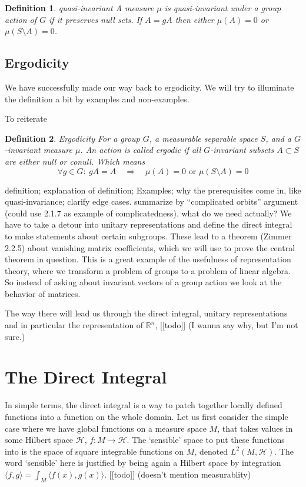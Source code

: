 \documentclass[
]{article}
\newtheorem{defn}{Definition}
\begin{document}
\begin{defn}{quasi-invariant}
A measure $\mu$ is quasi-invariant under a group action of $G$ if it preserves null sets.
If $A = gA$ then either $\mu(A)=0$ or $\mu(S\setminus A)=0$.
\end{defn}

\hypertarget{ergodicity}{%
\subsection{Ergodicity}\label{ergodicity}}

We have successfully made our way back to ergodicity. We will try to
illuminate the definition a bit by examples and non-examples.

To reiterate

\begin{defn}{Ergodicity}
For a group $G$, a measurable separable space $S$, and a $G$-invariant measure $\mu$. An action is called ergodic if all $G$-invariant subsets $A\subset S$ are either null or conull. Which means 
$$
\forall g\in G:\ gA = A \quad \Rightarrow \quad \mu(A)=0 \text{ or } \mu(S\setminus A)=0
$$
\end{defn}

definition; explanation of definition; Examples; why the prerequisites
come in, like quasi-invariance; clarify edge cases. summarize by
``complicated orbits'' argument (could use 2.1.7 as example of
complicatedness).
what do we need actually? We have to take a detour into unitary
representations and define the direct integral to make statements about
certain subgroups. These lead to a theorem (Zimmer 2.2.5) about
vanishing matrix coefficients, which we will use to prove the central
theorem in question. This is a great example of the usefulness of
representation theory, where we transform a problem of groups to a
problem of linear algebra. So instead of asking about invariant vectors
of a group action we look at the behavior of matrices.

The way there will lead us through the direct integral, unitary
representations and in particular the representation of
\(\mathbb{R}^n\), {[}{[}todo{]}{]} (I wanna say why, but I'm not sure.)

\hypertarget{the-direct-integral}{%
\section{The Direct Integral}\label{the-direct-integral}}

In simple terms, the direct integral is a way to patch together locally
defined functions into a function on the whole domain. Let us first
consider the simple case where we have global functions on a measure
space \(M\), that takes values in some Hilbert space \(\mathscr{H}\),
\(f:M \rightarrow \mathscr{H}\). The `sensible' space to put these
functions into is the space of square integrable functions on \(M\),
denoted \(L^2(M, \mathscr{H})\). The word `sensible' here is justified
by being again a Hilbert space by integration
\(\langle f, g\rangle = \int_M\langle f(x), g(x)\rangle\).
{[}{[}todo{]}{]} (doesn't mention measurablity)
\end{document}
